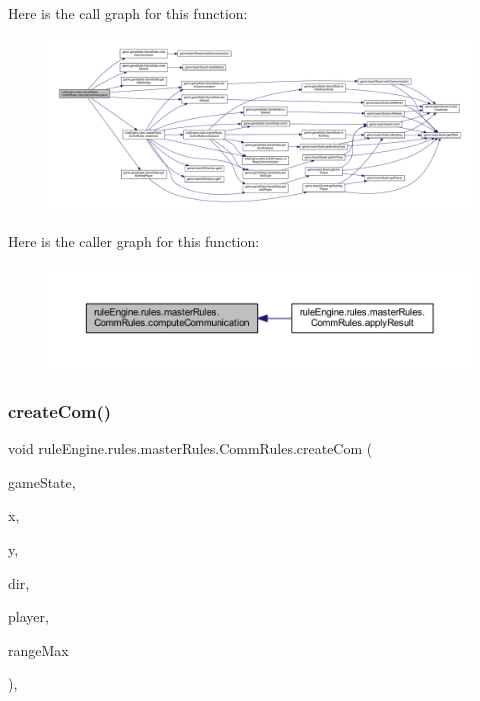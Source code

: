 Here is the call graph for this function\+:
\nopagebreak
\begin{figure}[H]
\begin{center}
\leavevmode
\includegraphics[width=350pt]{classrule_engine_1_1rules_1_1master_rules_1_1_comm_rules_af8de9ef94d7ef2e2878534c7716490fc_cgraph}
\end{center}
\end{figure}
Here is the caller graph for this function\+:
\nopagebreak
\begin{figure}[H]
\begin{center}
\leavevmode
\includegraphics[width=350pt]{classrule_engine_1_1rules_1_1master_rules_1_1_comm_rules_af8de9ef94d7ef2e2878534c7716490fc_icgraph}
\end{center}
\end{figure}
\mbox{\label{classrule_engine_1_1rules_1_1master_rules_1_1_comm_rules_a53d83ec67dede91baf381c333465c96f}} 
\subsubsection{\texorpdfstring{create\+Com()}{createCom()}}
{\footnotesize\ttfamily void rule\+Engine.\+rules.\+master\+Rules.\+Comm\+Rules.\+create\+Com (\begin{DoxyParamCaption}\item[{\mbox{\hyperlink{classgame_1_1game_state_1_1_game_state}{Game\+State}}}]{game\+State,  }\item[{int}]{x,  }\item[{int}]{y,  }\item[{\mbox{\hyperlink{enumgame_1_1board_1_1_e_direction}{E\+Direction}}}]{dir,  }\item[{\mbox{\hyperlink{enumgame_1_1_e_player}{E\+Player}}}]{player,  }\item[{int}]{range\+Max }\end{DoxyParamCaption})\hspace{0.3cm}{\ttfamily [inline]}, {\ttfamily [private]}}

